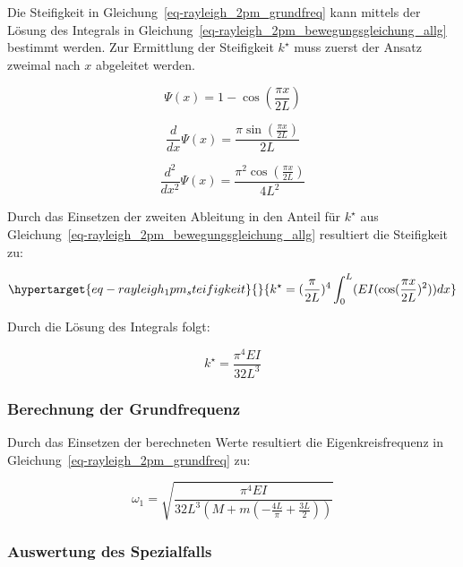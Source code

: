 \documentclass[
  letterpaper,
  DIV=11]{scrreprt}
\begin{document}
Die Steifigkeit in Gleichung~\ref{eq-rayleigh_2pm_grundfreq} kann
mittels der Lösung des Integrals in
Gleichung~\ref{eq-rayleigh_2pm_bewegungsgleichung_allg} bestimmt werden.
Zur Ermittlung der Steifigkeit \(k^\star\) muss zuerst der Ansatz
zweimal nach \(x\) abgeleitet werden.

\begin{equation}\Psi{\left(x \right)} = 1 - \cos{\left(\frac{\pi x}{2 L} \right)}\end{equation}

\begin{equation}\frac{d}{d x} \Psi{\left(x \right)} = \frac{\pi \sin{\left(\frac{\pi x}{2 L} \right)}}{2 L}\end{equation}

\begin{equation}\frac{d^{2}}{d x^{2}} \Psi{\left(x \right)} = \frac{\pi^{2} \cos{\left(\frac{\pi x}{2 L} \right)}}{4 L^{2}}\end{equation}

Durch das Einsetzen der zweiten Ableitung in den Anteil für \(k^\star\)
aus Gleichung~\ref{eq-rayleigh_2pm_bewegungsgleichung_allg} resultiert
die Steifigkeit zu:

\begin{equation}\protect\hypertarget{eq-rayleigh_1pm_steifigkeit}{}{
k^\star = (\frac{\pi}{2L})^4 \int_0^L(EI(\cos(\frac{\pi x}{2L})^2)) dx
}\label{eq-rayleigh_1pm_steifigkeit}\end{equation}

Durch die Lösung des Integrals folgt:

\begin{equation}k^{\star} = \frac{\pi^{4} E I}{32 L^{3}}\end{equation}

\hypertarget{berechnung-der-grundfrequenz-1}{%
\subsubsection{Berechnung der
Grundfrequenz}\label{berechnung-der-grundfrequenz-1}}

Durch das Einsetzen der berechneten Werte resultiert die
Eigenkreisfrequenz in Gleichung~\ref{eq-rayleigh_2pm_grundfreq} zu:

\begin{equation}\omega_{1} = \sqrt{\frac{\pi^{4} E I}{32 L^{3} \left(M + m \left(- \frac{4 L}{\pi} + \frac{3 L}{2}\right)\right)}}\end{equation}

\hypertarget{auswertung-des-spezialfalls-1}{%
\subsubsection{Auswertung des
Spezialfalls}\label{auswertung-des-spezialfalls-1}}
\end{document}
